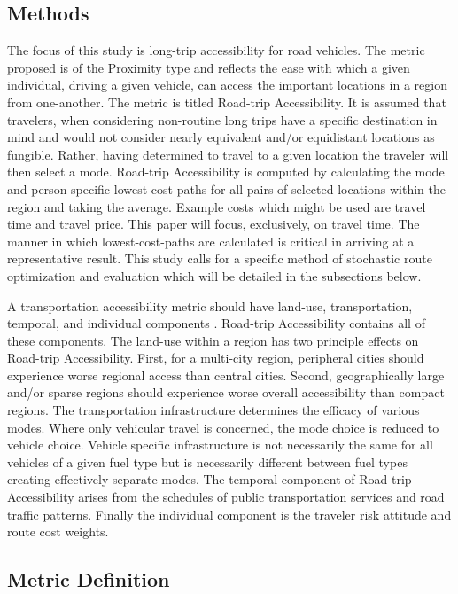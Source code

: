 \documentclass[11pt]{article}
\begin{document}
\begin{multicols}{2}
\section*{Methods}

The focus of this study is long-trip accessibility for road vehicles. The metric proposed is of the Proximity type and reflects the ease with which a given individual, driving a given vehicle, can access the important locations in a region from one-another. The metric is titled Road-trip Accessibility. It is assumed that travelers, when considering non-routine long trips have a specific destination in mind and would not consider nearly equivalent and/or equidistant locations as fungible. Rather, having determined to travel to a given location the traveler will then select a mode. Road-trip Accessibility is computed by calculating the mode and person specific lowest-cost-paths for all pairs of selected locations within the region and taking the average. Example costs which might be used are travel time and travel price. This paper will focus, exclusively, on travel time. The manner in which lowest-cost-paths are calculated is critical in arriving at a representative result. This study calls for a specific method of stochastic route optimization and evaluation which will be detailed in the subsections below.

A transportation accessibility metric should have land-use, transportation, temporal, and individual components \cite{Karst_2003}. Road-trip Accessibility contains all of these components. The land-use within a region has two principle effects on Road-trip Accessibility. First, for a multi-city region, peripheral cities should experience worse regional access than central cities. Second, geographically large and/or sparse regions should experience worse overall accessibility than compact regions. The transportation infrastructure determines the efficacy of various modes. Where only vehicular travel is concerned, the mode choice is reduced to vehicle choice. Vehicle specific infrastructure is not necessarily the same for all vehicles of a given fuel type but is necessarily different between fuel types creating effectively separate modes. The temporal component of Road-trip Accessibility arises from the schedules of public transportation services and road traffic patterns. Finally the individual component is the traveler risk attitude and route cost weights.

\subsection*{Metric Definition}


\end{multicols}
\end{document}
